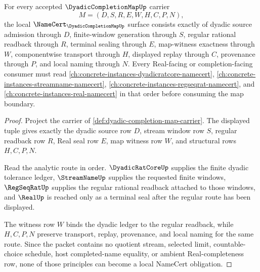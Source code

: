 \begin{theorem}
\label{thm:dyadic-completion-map-namecert-obligations}
For every accepted $\DyadicCompletionMapUp$ carrier
$$
M=(D,S,R,E,W,H,C,P,N),
$$
the local $\NameCert_{\DyadicCompletionMapUp}$ surface consists exactly of dyadic source admission through $D$, finite-window generation through $S$, regular rational readback through $R$, terminal sealing through $E$, map-witness exactness through $W$, componentwise transport through $H$, displayed replay through $C$, provenance through $P$, and local naming through $N$. Every Real-facing or completion-facing consumer must read \autoref{ch:concrete-instances-dyadicratcore-namecert}, \autoref{ch:concrete-instances-streamname-namecert}, \autoref{ch:concrete-instances-regseqrat-namecert}, and \autoref{ch:concrete-instances-real-namecert} in that order before consuming the map boundary.
\end{theorem}
\begin{proof}
Project the carrier of \autoref{def:dyadic-completion-map-carrier}. The displayed tuple gives exactly the dyadic source row $D$, stream window row $S$, regular readback row $R$, Real seal row $E$, map witness row $W$, and structural rows $H,C,P,N$.

Read the analytic route in order. $\DyadicRatCoreUp$ supplies the finite dyadic tolerance ledger, $\StreamNameUp$ supplies the requested finite windows, $\RegSeqRatUp$ supplies the regular rational readback attached to those windows, and $\RealUp$ is reached only as a terminal seal after the regular route has been displayed.

The witness row $W$ binds the dyadic ledger to the regular readback, while $H,C,P,N$ preserve transport, replay, provenance, and local naming for the same route. Since the packet contains no quotient stream, selected limit, countable-choice schedule, host completed-name equality, or ambient Real-completeness row, none of those principles can become a local NameCert obligation.
\end{proof}



